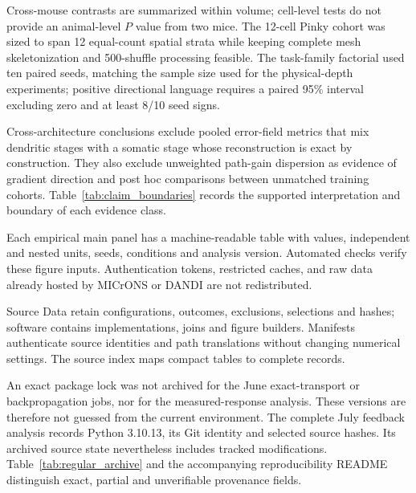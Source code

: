 Cross-mouse contrasts are summarized within volume; cell-level tests do not provide an animal-level $P$ value from two mice. The 12-cell Pinky
cohort was sized to span 12 equal-count spatial strata while keeping complete
mesh skeletonization and 500-shuffle processing feasible. The task-family
factorial used ten paired seeds, matching the sample size used for the
physical-depth experiments; positive directional language
requires a paired 95\% interval excluding zero and at least 8/10 seed signs.

Cross-architecture conclusions exclude pooled error-field metrics that mix
dendritic stages with a somatic stage whose reconstruction is exact by
construction. They also exclude unweighted path-gain dispersion as evidence
of gradient direction and post hoc comparisons between unmatched training
cohorts. Table~\ref{tab:claim_boundaries} records the supported
interpretation and boundary of each evidence class.

Each empirical main panel has a machine-readable table with values, independent and nested units, seeds, conditions and analysis version. Automated checks verify these figure inputs.
Authentication tokens, restricted caches, and raw data already hosted by
MICrONS or DANDI are not redistributed.

Source Data retain configurations, outcomes, exclusions, selections and hashes; software contains implementations, joins and figure builders. Manifests authenticate source identities and path translations without changing numerical settings. The source index maps compact tables to complete records.

An exact package lock was not archived for the June exact-transport or
backpropagation jobs, nor for the measured-response analysis. These versions
are therefore not guessed from the current environment. The complete July feedback analysis records Python 3.10.13, its Git identity
and selected source hashes. Its archived source state nevertheless includes
tracked modifications. Table~\ref{tab:regular_archive}
and the accompanying reproducibility README distinguish exact, partial and
unverifiable provenance fields.
